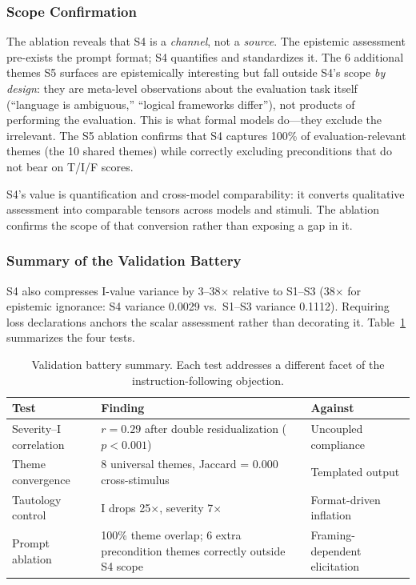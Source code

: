 \subsubsection{Scope Confirmation}

The ablation reveals that S4 is a \emph{channel}, not a
\emph{source}.  The epistemic assessment pre-exists the prompt format;
S4 quantifies and standardizes it.  The 6 additional themes S5
surfaces are epistemically interesting but fall outside S4's scope
\emph{by design}: they are meta-level observations about the evaluation
task itself (``language is ambiguous,'' ``logical frameworks differ''),
not products of performing the evaluation.  This is what formal models
do---they exclude the irrelevant.  The S5 ablation confirms that S4
captures 100\% of evaluation-relevant themes (the 10 shared themes)
while correctly excluding preconditions that do not bear on T/I/F
scores.

S4's value is quantification and cross-model comparability: it converts
qualitative assessment into comparable tensors across models and stimuli.
The ablation confirms the scope of that conversion rather than exposing
a gap in it.

\subsubsection{Summary of the Validation Battery}

S4 also compresses I-value variance by 3--38$\times$ relative to
S1--S3 (38$\times$ for epistemic ignorance: S4 variance 0.0029 vs.\
S1--S3 variance 0.1112).  Requiring loss declarations anchors the
scalar assessment rather than decorating it.  Table~\ref{tab:battery}
summarizes the four tests.

\begin{table}[t]
\centering
\caption{Validation battery summary. Each test addresses a different
facet of the instruction-following objection.}
\label{tab:battery}
\begin{tabular}{lp{5.2cm}l}
\toprule
\textbf{Test} & \textbf{Finding} & \textbf{Against} \\
\midrule
Severity--I correlation & $r = 0.29$ after double residualization ($p < 0.001$)
  & Uncoupled compliance \\
Theme convergence & 8 universal themes, Jaccard = 0.000 cross-stimulus
  & Templated output \\
Tautology control & I drops 25$\times$, severity 7$\times$
  & Format-driven inflation \\
Prompt ablation & 100\% theme overlap; 6 extra precondition themes correctly outside S4 scope
  & Framing-dependent elicitation \\
\bottomrule
\end{tabular}
\end{table}

